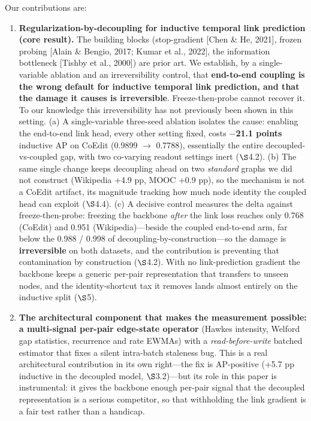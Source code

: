 \documentclass[conference]{IEEEtran}
\begin{document}
Our contributions are:

\begin{enumerate}
\item \textbf{Regularization-by-decoupling for inductive temporal link prediction (core result).} The building blocks (stop-gradient [Chen \& He, 2021], frozen probing [Alain \& Bengio, 2017; Kumar et al., 2022], the information bottleneck [Tishby et al., 2000]) are prior art. We establish, by a single-variable ablation and an irreversibility control, that \textbf{end-to-end coupling is the wrong default for inductive temporal link prediction, and that the damage it causes is irreversible}. Freeze-then-probe cannot recover it. To our knowledge this irreversibility has not previously been shown in this setting. (a) A single-variable three-seed ablation isolates the cause: enabling the end-to-end link head, every other setting fixed, costs \textbf{$-$21.1 points} inductive AP on CoEdit (0.9899 $\rightarrow$ 0.7788), essentially the entire decoupled-vs-coupled gap, with two co-varying readout settings inert ($\S$4.2). (b) The same single change keeps decoupling ahead on two \emph{standard} graphs we did not construct (Wikipedia +4.9 pp, MOOC +0.9 pp), so the mechanism is not a CoEdit artifact, its magnitude tracking how much node identity the coupled head can exploit ($\S$4.4). (c) A decisive control measures the delta against freeze-then-probe: freezing the backbone \emph{after} the link loss reaches only 0.768 (CoEdit) and 0.951 (Wikipedia)---beside the coupled end-to-end arm, far below the 0.988 / 0.998 of decoupling-by-construction---so the damage is \textbf{irreversible} on both datasets, and the contribution is preventing that contamination by construction ($\S$4.2). With no link-prediction gradient the backbone keeps a generic per-pair representation that transfers to unseen nodes, and the identity-shortcut tax it removes lands almost entirely on the inductive split ($\S$5).
\item \textbf{The architectural component that makes the measurement possible: a multi-signal per-pair edge-state operator} (Hawkes intensity, Welford gap statistics, recurrence and rate EWMAs) with a \emph{read-before-write} batched estimator that fixes a silent intra-batch staleness bug. This is a real architectural contribution in its own right---the fix is AP-positive (+5.7 pp inductive in the decoupled model, $\S$3.2)---but its role in this paper is instrumental: it gives the backbone enough per-pair signal that the decoupled representation is a serious competitor, so that withholding the link gradient is a fair test rather than a handicap.
\end{enumerate}
\end{document}
